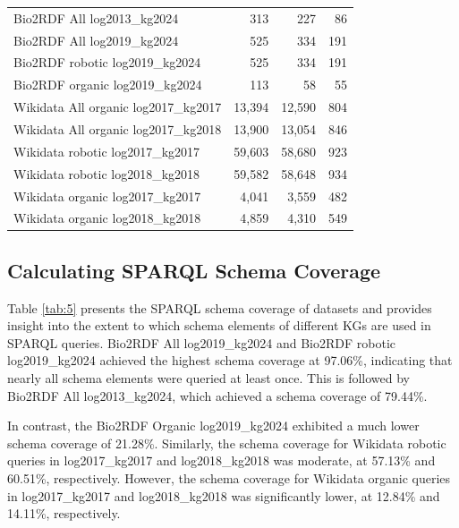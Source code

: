 \documentclass[sw]{iosart2x}
\providecommand{\DIFaddendFL}{} %
\DeclareRobustCommand{\DIFaddendFL}{\DIFOaddendFL \let\includegraphics\DIFOincludegraphics} %
\begin{document}
\begin{table}[ht]
\begin{tabular}{l|r|r|r}
\hline
Bio2RDF All log2013\_kg2024 & 313 & 227 & 86 \\
Bio2RDF All log2019\_kg2024 & 525 & 334 & 191 \\
Bio2RDF robotic log2019\_kg2024 &  525 & 334 & 191 \\
Bio2RDF organic log2019\_kg2024 &  113 & 58 & 55 \\
Wikidata All organic log2017\_kg2017 & 13,394 & 12,590 & 804 \\
Wikidata All organic log2017\_kg2018 & 13,900 & 13,054 & 846 \\
Wikidata robotic log2017\_kg2017 & 59,603 & 58,680 & 923 \\
Wikidata robotic log2018\_kg2018 & 59,582 & 58,648 & 934 \\
Wikidata organic log2017\_kg2017 & 4,041 & 3,559 & 482 \\
Wikidata organic log2018\_kg2018 & 4,859 & 4,310 & 549 \\
\hline
\end{tabular}
\DIFaddendFL \end{table}

\subsection{Calculating SPARQL Schema Coverage}
Table \ref{tab:5} presents the SPARQL schema coverage of datasets and provides insight into the extent to which schema elements of different KGs are used in SPARQL queries. Bio2RDF All log2019\_kg2024 and Bio2RDF robotic log2019\_kg2024 achieved the highest schema coverage at 97.06\%, indicating that nearly all schema elements were queried at least once. This is followed by Bio2RDF All log2013\_kg2024, which achieved a schema coverage of 79.44\%.  

In contrast, the Bio2RDF Organic log2019\_kg2024 exhibited a much lower schema coverage of 21.28\%. Similarly, the schema coverage for Wikidata robotic queries in log2017\_kg2017 and log2018\_kg2018 was moderate, at 57.13\% and 60.51\%, respectively. However, the schema coverage for Wikidata organic queries in log2017\_kg2017 and log2018\_kg2018 was significantly lower, at 12.84\% and 14.11\%, respectively.
\end{document}
